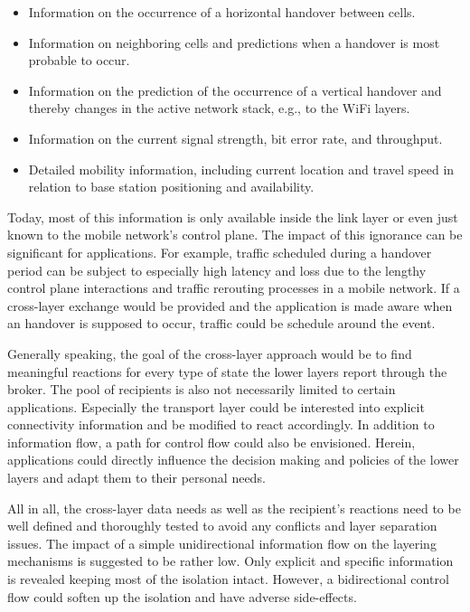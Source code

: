 \begin{itemize}
	\item Information on the occurrence of a horizontal handover between cells.

	\item Information on neighboring cells and predictions when a handover is most probable to occur.

	\item Information on the prediction of the occurrence of a vertical handover and thereby changes in the active network stack, e.g., to the WiFi layers.

	\item Information on the current signal strength, bit error rate, and throughput.

	\item Detailed mobility information, including current location and travel speed in relation to base station positioning and availability.
\end{itemize}

Today, most of this information is only available inside the link layer or even just known to the mobile network's control plane. The impact of this ignorance can be significant for applications. For example, traffic scheduled during a handover period can be subject to especially high latency and loss due to the lengthy control plane interactions and traffic rerouting processes in a mobile network. If a cross-layer exchange would be provided and the application is made aware when an handover is supposed to occur, traffic could be schedule around the event. 

Generally speaking, the goal of the cross-layer approach would be to find meaningful reactions for every type of state the lower layers report through the broker. The pool of recipients is also not necessarily limited to certain applications. Especially the transport layer could be interested into explicit connectivity information and be modified to react accordingly. In addition to information flow, a path for control flow could also be envisioned. Herein, applications could directly influence the decision making and policies of the lower layers and adapt them to their personal needs.

All in all, the cross-layer data needs as well as the recipient's reactions need to be well defined and thoroughly tested to avoid any conflicts and layer separation issues. The impact of a simple unidirectional information flow on the layering mechanisms is suggested to be rather low. Only explicit and specific information is revealed keeping most of the isolation intact. However, a bidirectional control flow could soften up the isolation and have adverse side-effects. 

